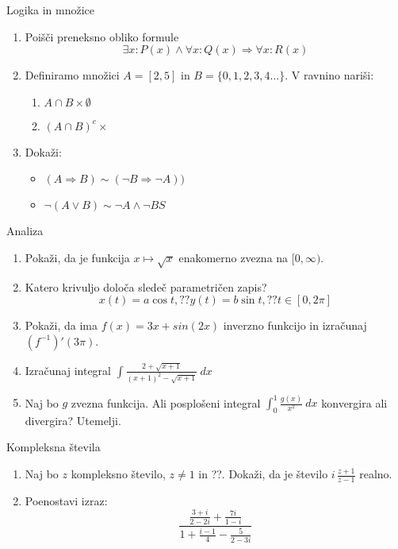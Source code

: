 \begin{frame}{Logika in množice}
	\begin{enumerate}
		\item
		Poišči preneksno obliko formule 
		$$\exists x : P(x) \wedge \forall x : Q(x) \Rightarrow \forall x : R(x)$$
		\item 
		Definiramo množici $A=[2,5]$ in $B=\{0,1,2,3,4\ldots\}$.
		V ravnino nariši:
		\begin{enumerate}
		   \item $A\cap B \times \emptyset$
		   \item $(A\cap B)^c \times$
		\end{enumerate}
		\item
		Dokaži:
		\begin{itemize}
			\item $(A\Rightarrow B)\sim(\neg B\Rightarrow \neg A))$
			\item $\neg(A \vee B)\sim \neg A \wedge \neg BS$
		\end{itemize}
	\end{enumerate}
\end{frame}

\begin{frame}{Analiza}
	\begin{enumerate}
		\item
		Pokaži, da je funkcija $x\mapsto \sqrt{x}$ enakomerno zvezna na $[0,\infty)$.
		\item 
		Katero krivuljo določa sledeč parametričen zapis?
		$$
		   x(t) = a \cos t, ?? %
		   y(t) = b \sin t, ?? %
		   t \in [0, 2 \pi]
		$$ 
		\item
		Pokaži, da ima $f(x)=3x + sin(2x)$ inverzno funkcijo 
		in izračunaj $(f^{-1})'(3\pi)$.
		
		\item
		Izračunaj integral 
		$\displaystyle \int\frac{2+\sqrt{x+1}}{(x+1)^2-\sqrt{x+1}} \ dx$
		\item 
		Naj bo $g$ zvezna funkcija. Ali posplošeni integral 
		$\int_{0}^{1}\frac{g(x)}{x^2} \ dx$
		konvergira ali divergira? Utemelji.
	\end{enumerate}
\end{frame}

\begin{frame}{Kompleksna števila}
	\begin{enumerate}
		\item
		Naj bo $z$ kompleksno število, $z \ne 1$ in ??.
		Dokaži, da je število \( i \, \frac{z+1}{z-1} \) realno.
		\item
		Poenostavi izraz:
		\[\frac{\frac{3+i}{2-2i}+\frac{7i}{1-i}}{1+\frac{i-1}{4}-\frac{5}{2-3i}}\]
	\end{enumerate}
\end{frame}